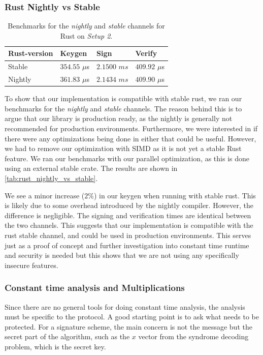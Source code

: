 \documentclass[11pt]{report}
\theoremstyle{definition}
\theoremstyle{plain}
\begin{document}
\subsubsection{Rust Nightly vs Stable}

\begin{table}[H]
  \centering
  \begin{tabular}{l|lll}
    \hline
    Rust-version & Keygen          & Sign          & Verify          \\
    \hline
    Stable       & $354.55$ $\mu$s & $2.1500$ $ms$ & $409.92$ $\mu$s \\
    Nightly      & $361.83$ $\mu$s & $2.1434$ $ms$ & $409.90$ $\mu$s \\
    \hline
  \end{tabular}
  \caption{Benchmarks for the \textit{nightly} and \textit{stable} channels for Rust on \textit{Setup 2}.}
  \label{tab:rust_nightly_vs_stable}
\end{table}

To show that our implementation is compatible with stable rust, we ran our benchmarks for the \textit{nightly} and \textit{stable} channels. The reason behind this is to argue that our library is production ready, as the nightly is generally not recommended for production environments. Furthermore, we were interested in if there were any optimizations being done in either that could be useful. However, we had to remove our optimization with SIMD as it is not yet a stable Rust feature. We ran our benchmarks with our parallel optimization, as this is done using an external stable crate. The results are shown in \autoref{tab:rust_nightly_vs_stable}.

We see a minor increase ($2\%$) in our keygen when running with stable rust. This is likely due to some overhead introduced by the nightly compiler. However, the difference is negligible. The signing and verification times are identical between the two channels. This suggests that our implementation is compatible with the rust stable channel, and could be used in production environments. This serves just as a proof of concept and further investigation into constant time runtime and security is needed but this shows that we are not using any specifically insecure features.

\subsubsection{Constant time analysis and Multiplications}
Since there are no general tools for doing constant time analysis, the analysis must be specific to the protocol. A good starting point is to ask what needs to be protected. For a signature scheme, the main concern is not the message but the secret part of the algorithm, such as the $x$ vector from the syndrome decoding problem, which is the secret key.
\end{document}
